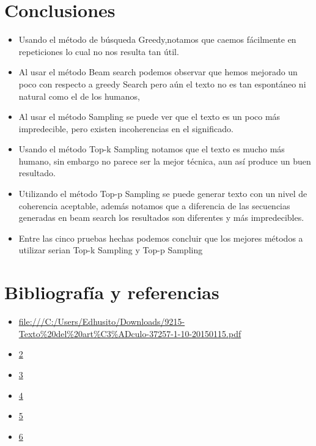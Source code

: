 \documentclass[10pt,twocolumn]{article}
\theoremstyle{definition}
\begin{document}
\section{Conclusiones}
\begin{itemize}
    \item Usando el método de búsqueda Greedy,notamos que caemos fácilmente en repeticiones lo cual no nos resulta tan útil.
    \item Al usar el método Beam search podemos observar que hemos mejorado un poco con respecto a greedy Search pero aún el texto no es tan espontáneo ni natural como el de los humanos, 
    \item Al usar el método Sampling se puede ver que el texto es un poco más impredecible, pero existen incoherencias en el significado.
    \item Usando el método Top-k Sampling notamos que el texto es mucho más humano, sin embargo no parece ser la mejor técnica, aun así produce un buen resultado.
    \item Utilizando el método Top-p Sampling se puede generar texto con un nivel de coherencia aceptable, además notamos que a diferencia de las secuencias generadas en beam search los resultados son diferentes y más impredecibles.
    \item Entre las cinco pruebas hechas podemos concluir que los mejores métodos a utilizar serian Top-k Sampling y Top-p Sampling

\end{itemize}

\newpage
\section{Bibliografía y referencias}

\begin{itemize}
    \item \url{file:///C:/Users/Edhusito/Downloads/9215-Texto\%20del\%20art\%C3\%ADculo-37257-1-10-20150115.pdf}
    \item \url{2}
    \item \url{3}
    \item \url{4}
    \item \url{5}
    \item \url{6}
\end{itemize}
\end{document}
